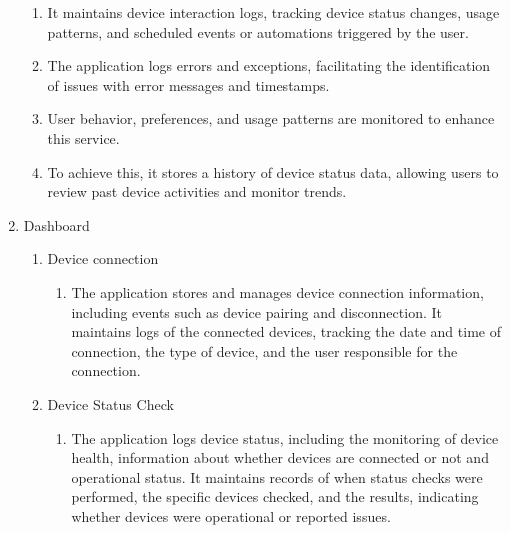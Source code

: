\documentclass[11pt, conference]{IEEEtran}
\begin{document}
\begin{enumerate}[label=\arabic*.]
\begin{enumerate}[label*={\arabic*.},ref=\theenumi.\arabic*]
        \item It maintains device interaction logs, tracking device status changes, usage patterns, and scheduled events or automations triggered by the user. \\
        
        \item The application logs errors and exceptions, facilitating the identification of issues with error messages and timestamps. \\
        
        \item User behavior, preferences, and usage patterns are monitored to enhance this service. \\
        
        \item To achieve this, it stores a history of device status data, allowing users to review past device activities and monitor trends.\\
    \end{enumerate}


    \item {\large{Dashboard}}
    \begin{enumerate}[label=\arabic*.]
        \item {\large{Device connection}}\\
        \begin{enumerate}[label*={\arabic*.},ref=\theenumi.\arabic*]
        \setlength{\itemindent}{0.5cm}
            \item The application stores and manages device connection information, including events such as device pairing and disconnection. It maintains logs of the connected devices, tracking the date and time of connection, the type of device, and the user responsible for the connection.\\
        \end{enumerate}
        
        \item {\large{Device Status Check}}\\
        \begin{enumerate}[label*={\arabic*.},ref=\theenumi.\arabic*]
        \setlength{\itemindent}{0.5cm}
            \item The application logs device status, including the monitoring of device health, information about whether devices are connected or not and operational status. It maintains records of when status checks were performed, the specific devices checked, and the results, indicating whether devices were operational or reported issues.\\
        \end{enumerate}
        

\end{enumerate}
\end{enumerate}
\end{document}
